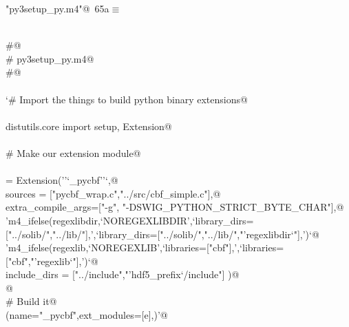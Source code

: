 \documentclass[10pt,a4paper,twoside,notitlepage]{article}
\begin{document}
\begin{flushleft} \small
\begin{minipage}{\linewidth}\label{scrap9}\raggedright\small
{} \verb@"py3setup_py.m4"@\nobreak\ {\footnotesize {65a}}$\equiv$
\vspace{-1ex}
\begin{list}{}{} \item
\mbox{}\verb@@\\
\mbox{}\verb@#@\\
\mbox{}\verb@#  py3setup_py.m4@\\
\mbox{}\verb@#@\\
\mbox{}\verb@@\\
\mbox{}\verb@`# Import the things to build python binary extensions@\\
\mbox{}\verb@@\\
\mbox{}\verb@from distutils.core import setup, Extension@\\
\mbox{}\verb@@\\
\mbox{}\verb@# Make our extension module@\\
\mbox{}\verb@@\\
\mbox{}\verb@e = Extension(''`_pycbf''`,@\\
\mbox{}\verb@              sources = ["pycbf_wrap.c","../src/cbf_simple.c"],@\\
\mbox{}\verb@         extra_compile_args=["-g", "-DSWIG_PYTHON_STRICT_BYTE_CHAR"],@\\
\mbox{}\verb@         'm4_ifelse(regexlibdir,`NOREGEXLIBDIR',`library_dirs=["../solib/","../lib/"],',`library_dirs=["../solib/","../lib/","'regexlibdir`"],')`@\\
\mbox{}\verb@         'm4_ifelse(regexlib,`NOREGEXLIB',`libraries=["cbf"],',`libraries=["cbf","'regexlib`"],')`@\\
\mbox{}\verb@         include_dirs = ["../include","'hdf5_prefix`/include"] )@\\
\mbox{}\verb@            @\\
\mbox{}\verb@# Build it@\\
\mbox{}\verb@setup(name="_pycbf",ext_modules=[e],)'@\\
\mbox{}\verb@@{\NWsep}
\end{list}
\vspace{-1.5ex}
\footnotesize
\begin{list}{}{\setlength{\itemsep}{-\parsep}\setlength{\itemindent}{-\leftmargin}}

\item{}
\end{list}
\end{minipage}\vspace{4ex}
\end{flushleft}
\end{document}
